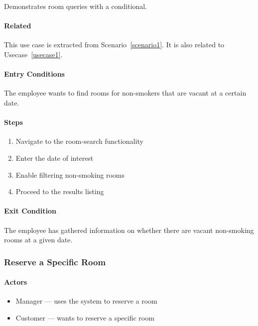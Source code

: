 Demonstrates room queries with a conditional.

\paragraph{Related}\label{related-1}
This use case is extracted from Scenario~\ref{scenario1}.
It is also related to Usecase~\ref{usecase1}.

\paragraph{Entry Conditions}\label{entry-conditions-1}

The employee wants to find rooms for non-smokers that are vacant at a
certain date.

\paragraph{Steps}\label{steps-1}

\begin{enumerate}
\def\labelenumi{\arabic{enumi}.}
\tightlist
\item
  Navigate to the room-search functionality
\item
  Enter the date of interest
\item
  Enable filtering non-smoking rooms
\item
  Proceed to the results listing
\end{enumerate}

\paragraph{Exit Condition}\label{exit-condition-1}

The employee has gathered information on whether there are vacant
non-smoking rooms at a given date.

\subsubsection{Reserve a Specific Room}\label{reserve-a-specific-room}

\paragraph{Actors}\label{actors-2}

\begin{itemize}
\tightlist
\item
  Manager --- uses the system to reserve a room
\item
  Customer --- wants to reserve a specific room
\end{itemize}

